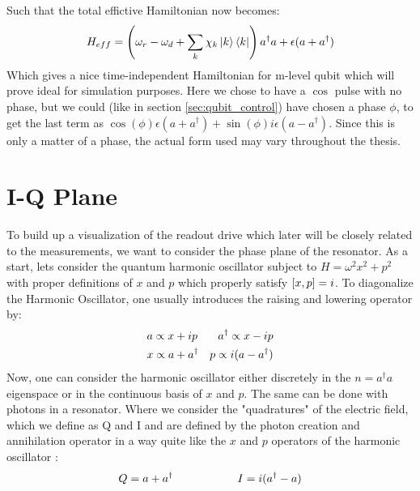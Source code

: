 Such that the total effictive Hamiltonian now becomes:
\begin{equation}
    H_{eff} =  \left(\omega_r - \omega_d + \sum_k \chi_k \ket{k}\bra{k}\right)a^\dagger a + \epsilon(a + a^\dagger)
\end{equation}
Which gives a nice time-independent Hamiltonian for m-level qubit which will prove ideal for simulation purposes. Here we chose to have a $\cos$ pulse with no phase, but we could (like in section \ref{sec:qubit_control}) have chosen a phase $\phi$, to get the last term as $\cos(\phi)\epsilon(a + a^\dagger) + \sin(\phi)i\epsilon(a - a^\dagger)$. Since this is only a matter of a phase, the actual form used may vary throughout the thesis. 



\section{I-Q Plane}
To build up a visualization of the readout drive which later will be closely related to the measurements, we want to consider the phase plane of the resonator. As a start, lets consider the quantum harmonic oscillator subject to $H = \omega^2  x^2 + p^2$ with proper definitions of $x$ and $p$ which properly satisfy $\comm{x}{p} = i$. To diagonalize the Harmonic Oscillator, one usually introduces the raising and lowering operator by:
\begin{align}
    &a \propto x + ip \hfill &a^\dagger \propto x - ip \\
    &x \propto a + a^\dagger \hfill &p\propto i (a - a^\dagger)
\end{align}
Now, one can consider the harmonic oscillator either discretely in the $n = a^\dagger a$ eigenspace or in the continuous basis of $x$ and $p$. The same can be done with photons in a resonator. Where we consider the "quadratures" of the electric field, which we define as Q and I and are defined by the photon creation and annihilation operator in a way quite like the $x$ and $p$ operators of the harmonic oscillator \cite{knight}:
\begin{equation}
    Q = a + a^\dagger \hspace{2 cm} I = i(a^\dagger - a)
\end{equation}

